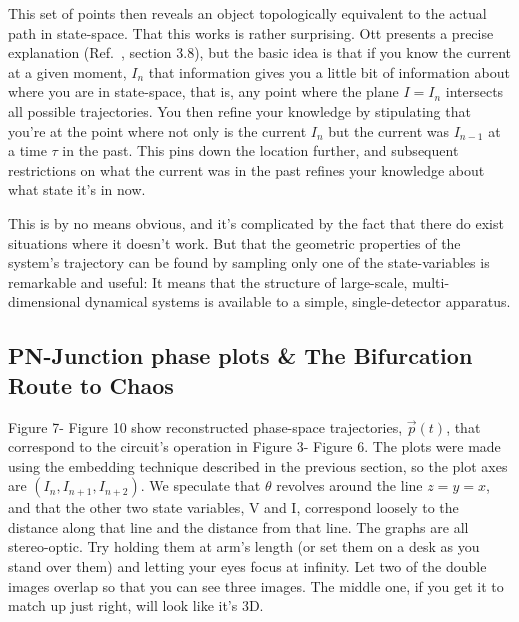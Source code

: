 \documentclass{../lab}
\begin{document}
This set of points then reveals an object topologically equivalent to the actual path in state-space. That this works is rather surprising. Ott presents a precise explanation (Ref.~\cite{Ott}, section 3.8), but the basic idea is that if you know the current at a given moment, $I_n$ that information gives you a little bit of information about where you are in state-space, that is, any point where the plane $I = I_n$ intersects all possible trajectories. You then refine your knowledge by stipulating that you're at the point where not only is the current $I_n$ but the current was $I_{n-1}$ at a time $\tau$ in the past. This pins down the location further, and subsequent restrictions on what the current was in the past refines your knowledge about what state it's in now.

This is by no means obvious, and it's complicated by the fact that there do exist situations where it doesn't work. But that the geometric properties of the system's trajectory can be found by sampling only one of the state-variables is remarkable and useful: It means that the structure of large-scale, multi-dimensional dynamical systems is available to a simple, single-detector apparatus.

\subsection{PN-Junction phase plots \& The Bifurcation Route to Chaos}

Figure 7- Figure 10 show reconstructed phase-space trajectories, $ \vec p(t) $, that correspond to the circuit's operation in Figure 3- Figure 6. The plots were made using the embedding technique described in the previous section, so the plot axes are $ (I_n, I_{n+1}, I_{n+2}) $. We speculate that $\theta$ revolves around the line $z = y = x$, and that the other two state variables, V and I, correspond loosely to the distance along that line and the distance from that line. The graphs are all stereo-optic. Try holding them at arm's length (or set them on a desk as you stand over them) and letting your eyes focus at infinity. Let two of the double images overlap so that you can see three images. The middle one, if you get it to match up just right, will look like it's 3D.
\end{document}
